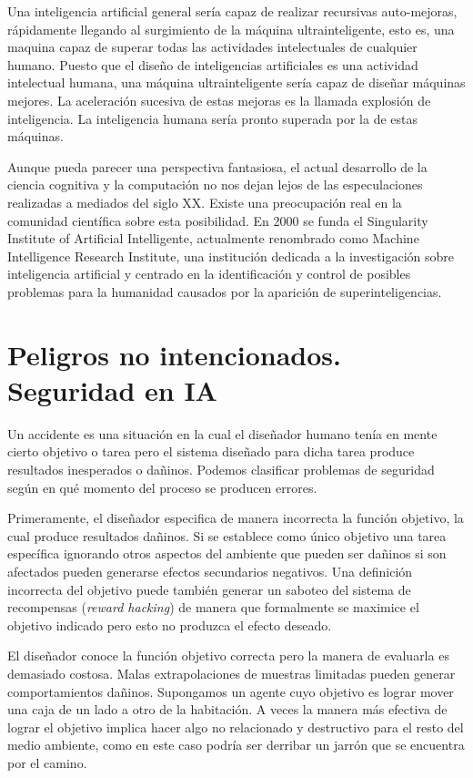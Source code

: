 \documentclass[12pt,a4paper]{article}
\begin{document}
Una inteligencia artificial general sería capaz de realizar recursivas auto-mejoras, rápidamente llegando al surgimiento de la máquina ultrainteligente, esto es, una maquina capaz de superar todas las actividades intelectuales de cualquier humano. Puesto que el diseño de inteligencias artificiales es una actividad intelectual humana, una máquina ultrainteligente sería capaz de diseñar máquinas mejores. La aceleración sucesiva de estas mejoras es la llamada explosión de inteligencia. La inteligencia humana sería pronto superada por la de estas máquinas.

Aunque pueda parecer una perspectiva fantasiosa, el actual desarrollo de la ciencia cognitiva y la computación no nos dejan lejos de las especulaciones realizadas a mediados del siglo XX. Existe una preocupación real en la comunidad científica sobre esta posibilidad. En 2000 se funda el Singularity Institute of Artificial Intelligente, actualmente renombrado como Machine Intelligence Research Institute, una institución dedicada a la investigación sobre inteligencia artificial y centrado en la identificación y control de posibles problemas para la humanidad causados por la aparición de superinteligencias.

\section{Peligros no intencionados. Seguridad en IA}

Un accidente es una situación en la cual el diseñador humano tenía en mente cierto objetivo o tarea pero el sistema diseñado para dicha tarea produce resultados inesperados o dañinos. Podemos clasificar problemas de seguridad según en qué momento del proceso se producen errores.

Primeramente, el diseñador especifica de manera incorrecta la función objetivo, la cual produce resultados dañinos. Si se establece como único objetivo una tarea específica ignorando otros aspectos del ambiente que pueden ser dañinos si son afectados pueden generarse efectos secundarios negativos. Una definición incorrecta del objetivo puede también generar un saboteo del sistema de recompensas (\emph{reward hacking}) de manera que formalmente se maximice el objetivo indicado pero esto no produzca el efecto deseado.

El diseñador conoce la función objetivo correcta pero la manera de evaluarla es demasiado costosa. Malas extrapolaciones de muestras limitadas pueden generar comportamientos dañinos. Supongamos un agente cuyo objetivo es lograr mover una caja de un lado a otro de la habitación. A veces la manera más efectiva de lograr el objetivo implica hacer algo no relacionado y destructivo para el resto del medio ambiente, como en este caso podría ser derribar un jarrón que se encuentra por el camino.
\end{document}
